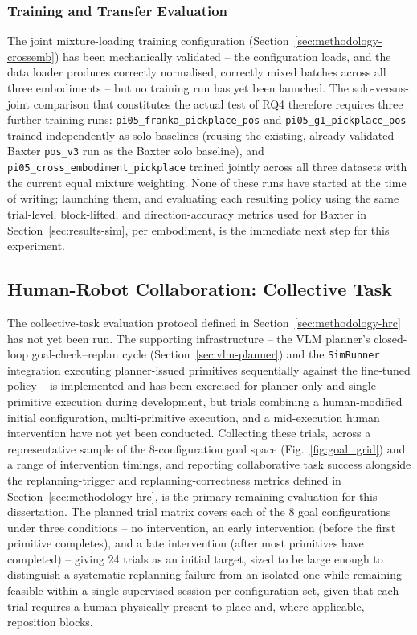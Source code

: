 \documentclass[12pt]{article}
\begin{document}
\subsubsection{Training and Transfer Evaluation}
The joint mixture-loading training configuration (Section~\ref{sec:methodology-crossemb}) has been mechanically validated -- the configuration loads, and the data loader produces correctly normalised, correctly mixed batches across all three embodiments -- but no training run has yet been launched. The solo-versus-joint comparison that constitutes the actual test of RQ4 therefore requires three further training runs: \texttt{pi05\_franka\_pickplace\_pos} and \texttt{pi05\_g1\_pickplace\_pos} trained independently as solo baselines (reusing the existing, already-validated Baxter \texttt{pos\_v3} run as the Baxter solo baseline), and \texttt{pi05\_cross\_embodiment\_pickplace} trained jointly across all three datasets with the current equal mixture weighting. None of these runs have started at the time of writing; launching them, and evaluating each resulting policy using the same trial-level, block-lifted, and direction-accuracy metrics used for Baxter in Section~\ref{sec:results-sim}, per embodiment, is the immediate next step for this experiment.

\subsection{Human-Robot Collaboration: Collective Task}
\label{sec:results-hrc}

The collective-task evaluation protocol defined in Section~\ref{sec:methodology-hrc} has not yet been run. The supporting infrastructure -- the VLM planner's closed-loop goal-check--replan cycle (Section~\ref{sec:vlm-planner}) and the \texttt{SimRunner} integration executing planner-issued primitives sequentially against the fine-tuned policy -- is implemented and has been exercised for planner-only and single-primitive execution during development, but trials combining a human-modified initial configuration, multi-primitive execution, and a mid-execution human intervention have not yet been conducted. Collecting these trials, across a representative sample of the 8-configuration goal space (Fig.~\ref{fig:goal_grid}) and a range of intervention timings, and reporting collaborative task success alongside the replanning-trigger and replanning-correctness metrics defined in Section~\ref{sec:methodology-hrc}, is the primary remaining evaluation for this dissertation. The planned trial matrix covers each of the 8 goal configurations under three conditions -- no intervention, an early intervention (before the first primitive completes), and a late intervention (after most primitives have completed) -- giving 24 trials as an initial target, sized to be large enough to distinguish a systematic replanning failure from an isolated one while remaining feasible within a single supervised session per configuration set, given that each trial requires a human physically present to place and, where applicable, reposition blocks.
\end{document}
